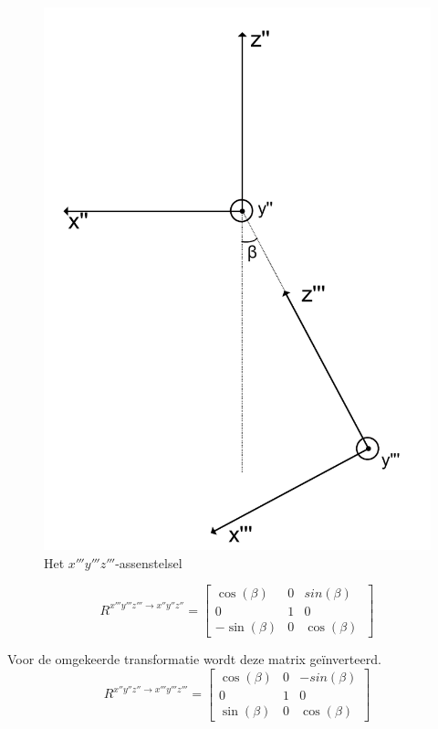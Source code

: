 \begin{figure}[H]
\centering
\includegraphics[scale=0.35]{x'''y'''z'''.pdf}
\caption{Het $x'''y'''z'''$-assenstelsel}
\end{figure}

\begin{equation*}
R^{x'''y'''z''' \rightarrow x''y''z''}=
  \begin{bmatrix}
    \cos(\beta) & 0 & sin(\beta)\\
    0 & 1 & 0\\ 
    -\sin(\beta) & 0 & \cos(\beta)\
    \end{bmatrix}
\end{equation*}

Voor de omgekeerde transformatie wordt deze matrix ge\"inverteerd.
\begin{equation*}
R^{x''y''z'' \rightarrow x'''y'''z'''}=
  \begin{bmatrix}
    \cos(\beta) & 0 & -sin(\beta)\\
    0 & 1 & 0\\ 
    \sin(\beta) & 0 & \cos(\beta)\
    \end{bmatrix}
\end{equation*}



